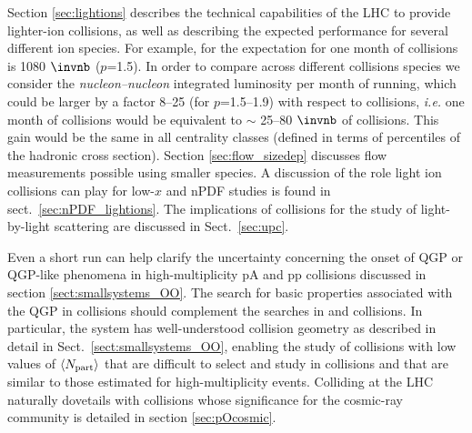 Section \ref{sec:lightions} describes the technical capabilities of the LHC to provide lighter-ion collisions, as well as describing the expected performance for several different ion species.
For example, for \ArAr the expectation for one month of collisions is 1080 $\invnb$ ($p$=1.5).  In order to compare across different collisions species we consider the \textit{nucleon--nucleon} integrated luminosity per month of running, which could be larger by a factor 8--25 (for $p$=1.5--1.9) with respect to \PbPb collisions, \textit{i.e.} one month of \ArAr collisions would be equivalent to $\sim$ 25--80 $\invnb$ of \PbPb collisions. This gain would be the same in all centrality classes (defined in terms of percentiles of the hadronic cross section).
Section \ref{sec:flow_sizedep} discusses flow measurements possible using smaller species.  A discussion of the role light ion collisions can play for low-$x$ and nPDF studies is found in sect.~\ref{sec:nPDF_lightions}.  The implications of \ArAr collisions for the study of light-by-light scattering are discussed in Sect.~\ref{sec:upc}. 

Even a short \OO run can help clarify the uncertainty concerning the onset of QGP or QGP-like phenomena in high-multiplicity pA and pp collisions discussed in section \ref{sect:smallsystems_OO}.  The search for basic properties associated with the QGP in \OO collisions should complement the searches in \pp and \pPb collisions.%
In particular, the \OO system has well-understood collision geometry as described in detail in Sect.~\ref{sect:smallsystems_OO}, enabling the study of collisions with low values of $\langle N_{\rm part}\rangle$ that are difficult to select and study in \PbPb collisions and that are similar to those estimated for high-multiplicity \pPb events. Colliding \OO at the LHC naturally dovetails with \pO collisions whose significance for the cosmic-ray community is detailed in section \ref{sec:pOcosmic}.

